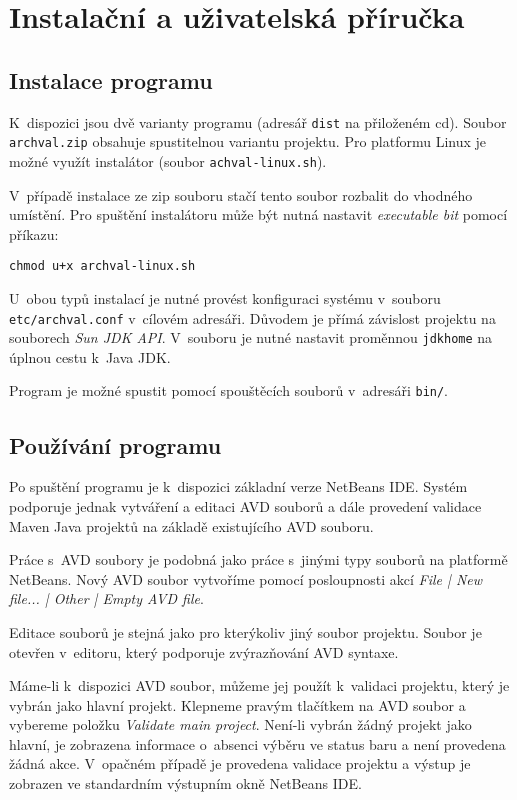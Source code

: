 \chapter{Instalační a uživatelská příručka}

\section{Instalace programu}

K~dispozici jsou dvě varianty programu (adresář \verb+dist+ na přiloženém cd). Soubor \verb+archval.zip+ obsahuje spustitelnou variantu projektu. Pro platformu Linux je možné využít instalátor (soubor \verb+achval-linux.sh+).

V~případě instalace ze zip souboru stačí tento soubor rozbalit do vhodného umístění. Pro spuštění instalátoru může být nutná nastavit \emph{executable bit} pomocí příkazu:

\begin{verbatim}
chmod u+x archval-linux.sh
\end{verbatim}

U~obou typů instalací je nutné provést konfiguraci systému v~souboru \verb+etc/archval.conf+ v~cílovém adresáři. Důvodem je přímá závislost projektu na souborech \emph{Sun JDK API}. V~souboru je nutné nastavit proměnnou \verb+jdkhome+ na úplnou cestu k~Java JDK.

Program je možné spustit pomocí spouštěcích souborů v~adresáři \verb+bin/+.

\section{Používání programu}
Po spuštění programu je k~dispozici základní verze NetBeans IDE. Systém podporuje jednak vytváření a editaci AVD souborů a dále provedení validace Maven Java projektů na základě existujícího AVD souboru.

Práce s~AVD soubory je podobná jako práce s~jinými typy souborů na platformě NetBeans. Nový AVD soubor vytvoříme pomocí posloupnosti akcí \emph{File | New file... | Other | Empty AVD file}.

Editace souborů je stejná jako pro kterýkoliv jiný soubor projektu. Soubor je otevřen v~editoru, který podporuje zvýrazňování AVD syntaxe.

Máme-li k~dispozici AVD soubor, můžeme jej použít k~validaci projektu, který je vybrán jako hlavní projekt. Klepneme pravým tlačítkem na AVD soubor a vybereme položku \emph{Validate main project}. Není-li vybrán žádný projekt jako hlavní, je zobrazena informace o~absenci výběru ve status baru a není provedena žádná akce. V~opačném případě je provedena validace projektu a výstup je zobrazen ve standardním výstupním okně NetBeans IDE.

